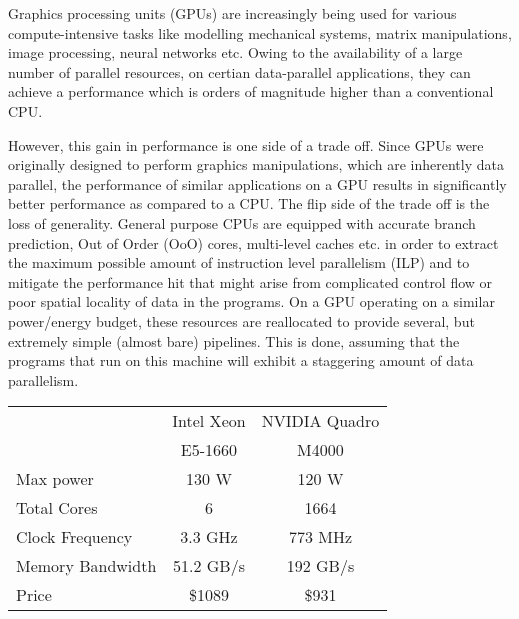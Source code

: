 
\label{sec:introduction}
\par{
	Graphics processing units (GPUs) are increasingly being used for various compute-intensive tasks like modelling mechanical systems, matrix manipulations, image processing, neural networks etc. Owing to the availability of a large number of parallel resources, on certian data-parallel applications, they can achieve a performance which is orders of magnitude higher than a conventional CPU.
}

\par{
	However, this gain in performance is one side of a trade off. Since GPUs were originally designed to perform graphics manipulations, which are inherently data parallel, the performance of similar applications on a GPU results in significantly better performance as compared to a CPU. The flip side of the trade off is the loss of generality. General purpose CPUs are equipped with accurate branch prediction, Out of Order (OoO) cores, multi-level caches etc. in order to extract the maximum possible amount of instruction level parallelism (ILP) and to mitigate the performance hit that might arise from complicated control flow or poor spatial locality of data in the programs. On a GPU operating on a similar power/energy budget, these resources are reallocated to provide several, but extremely simple (almost bare) pipelines. This is done, assuming that the programs that run on this machine will exhibit a staggering amount of data parallelism.
}

\begin{center}
	\begin{tabular}{|l|c|c|}
	\hline
			&	Intel Xeon 		& NVIDIA Quadro \\
			&	E5-1660			& M4000 \\
	\hline
	Max power 	&	130 W			& 120 W \\
	Total Cores		&	6			& 1664 \\
	Clock Frequency &	3.3 GHz			& 773 MHz \\
	Memory Bandwidth&	51.2 GB/s		& 192 GB/s \\
	Price		&	\$1089			& \$931 \\
	\hline
	\end{tabular}
\end{center}

